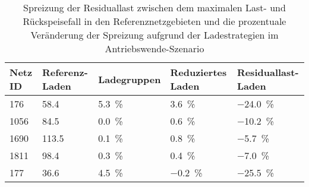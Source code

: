 {
\renewcommand{\arraystretch}{1.2}%
\begin{table}[H]
	\begin{center}
		\caption{Spreizung der Residuallast zwischen dem maximalen Last- und Rückspeisefall in den Referenznetzgebieten und die prozentuale Veränderung der Spreizung aufgrund der Ladestrategien im Antriebswende-Szenario}
		\begin{tabu} to \textwidth {X[0.5] X[1, r] X[1, r] X[1.2, r] X[1.2, r]}
			\toprule
			Netz ID    & Referenz-Laden  & Ladegruppen                               & Reduziertes Laden                          & Residuallast-Laden                         \\ \midrule
			\num{176}  & \SI{58.4}{\mw}  & \SI[retain-explicit-plus]{+5.3}{\percent} & \SI[retain-explicit-plus]{+3.6}{\percent}  & \SI[retain-explicit-plus]{-24.0}{\percent} \\
			\num{1056} & \SI{84.5}{\mw}  & \SI[retain-explicit-plus]{+0.0}{\percent} & \SI[retain-explicit-plus]{+0.6}{\percent}  & \SI[retain-explicit-plus]{-10.2}{\percent} \\
			\num{1690} & \SI{113.5}{\mw} & \SI[retain-explicit-plus]{+0.1}{\percent} & \SI[retain-explicit-plus]{+0.8}{\percent}  & \SI[retain-explicit-plus]{-5.7}{\percent}  \\
			\num{1811} & \SI{98.4}{\mw}  & \SI[retain-explicit-plus]{+0.3}{\percent} & \SI[retain-explicit-plus]{+0.4}{\percent}  & \SI[retain-explicit-plus]{-7.0}{\percent}  \\
			\num{177}  & \SI{36.6}{\mw}  & \SI[retain-explicit-plus]{+4.5}{\percent} & \SI[retain-explicit-plus]{-0.2}{\percent}  & \SI[retain-explicit-plus]{-25.5}{\percent} \\ \bottomrule
		\end{tabu}
		\label{tab:ResidualLoadSpread}
	\end{center}
	\vspace{-3mm}%
\end{table}
}